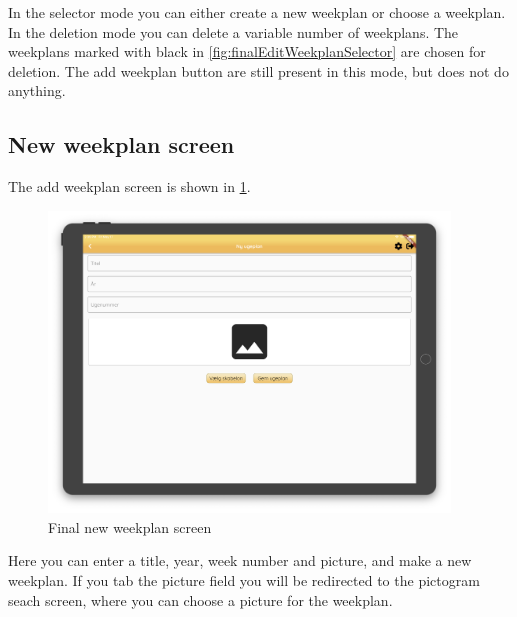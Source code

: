 In the selector mode you can either create a new weekplan or choose a weekplan. In the deletion mode you can delete a variable number of weekplans. The weekplans marked with black in \ref{fig:finalEditWeekplanSelector} are chosen for deletion. The add weekplan button are still present in this mode, but does not do anything.

\subsection{New weekplan screen}

The add weekplan screen is shown in \ref{fig:finalAddWeekplanSelector}.
\begin{figure}[H]
    \begin{center}
        \includegraphics[width=0.95\textwidth]{figures/FinalScreen/addWeekplanScreen.png}
    \end{center}
    \caption{Final new weekplan screen}
    \label{fig:finalAddWeekplanSelector}
\end{figure}
Here you can enter a title, year, week number and picture, and make a new weekplan. If you tab the picture field you will be redirected to the pictogram seach screen, where you can choose a picture for the weekplan.

